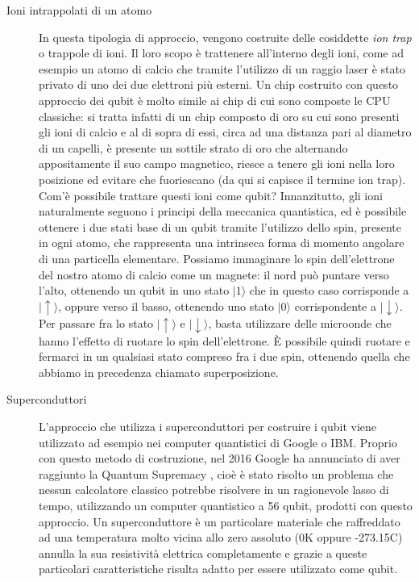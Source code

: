 \begin{description}
  \item[Ioni intrappolati di un atomo] In questa tipologia di approccio, vengono costruite delle cosiddette \textit{ion trap} o trappole di ioni. Il loro scopo è trattenere all'interno degli ioni, come ad esempio un atomo di calcio che tramite l'utilizzo di un raggio laser è stato privato di uno dei due elettroni più esterni. Un chip costruito con questo approccio dei qubit è molto simile ai chip di cui sono composte le CPU classiche: si tratta infatti di un chip composto di oro su cui sono presenti gli ioni di calcio e al di sopra di essi, circa ad una distanza pari al diametro di un capelli, è presente un sottile strato di oro che alternando appositamente il suo campo magnetico, riesce a tenere gli ioni nella loro posizione ed evitare che fuoriescano (da qui si capisce il termine ion trap). \\
  Com'è possibile trattare questi ioni come qubit? Innanzitutto, gli ioni naturalmente seguono i principi della meccanica quantistica, ed è possibile ottenere i due stati base di un qubit tramite l'utilizzo dello spin, presente in ogni atomo, che rappresenta una intrinseca forma di momento angolare di una particella elementare. Possiamo immaginare lo spin dell'elettrone del nostro atomo di calcio come un magnete: il nord può puntare verso l'alto, ottenendo un qubit in uno stato \(|1\rangle\) che in questo caso corrisponde a \(|\uparrow\rangle\), oppure verso il basso, ottenendo uno stato \(|0\rangle\) corrispondente a \(|\downarrow\rangle\). Per passare fra lo stato \(|\uparrow\rangle\) e \(|\downarrow\rangle\), basta utilizzare delle microonde che hanno l'effetto di ruotare lo spin dell'elettrone. È possibile quindi ruotare e fermarci in un qualsiasi stato compreso fra i due spin, ottenendo quella che abbiamo in precedenza chiamato superposizione.
  \item[Superconduttori] L'approccio che utilizza i superconduttori per costruire i qubit viene utilizzato ad esempio nei computer quantistici di Google o IBM. Proprio con questo metodo di costruzione, nel 2016 Google ha annunciato di aver raggiunto la Quantum Supremacy \cite{quantum_supremacy}, cioè è stato risolto un problema che nessun calcolatore classico potrebbe risolvere in un ragionevole lasso di tempo, utilizzando un computer quantistico a 56 qubit, prodotti con questo approccio. Un superconduttore è un particolare materiale che raffreddato ad una temperatura molto vicina allo zero assoluto (0K oppure -273.15C) annulla la sua resistività elettrica completamente e grazie a queste particolari caratteristiche risulta adatto per essere utilizzato come qubit.
\end{description}